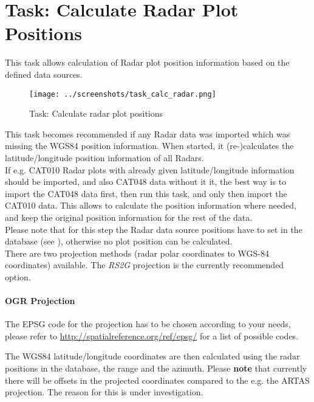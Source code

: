 \section{Task: Calculate Radar Plot Positions}
\label{sec:task_calc_radar_pos}

This task allows calculation of Radar plot position information based on the defined data sources.

\begin{figure}[H]
  \hspace*{-2.5cm}
    \texttt{[image: ../screenshots/task\_calc\_radar.png]}
  \caption{Task: Calculate radar plot positions}
  \label{fig:task_calc_radar}
\end{figure}

This task becomes recommended if any Radar data was imported which was missing the WGS84 position information. When started, it (re-)calculates the latitude/longitude position information of all Radars. \\

If e.g. CAT010 Radar plots with already given latitude/longitude information should be imported, and also CAT048 data without it it, the best way is to import the CAT048 data first, then run this task, and only then import the CAT010 data. This allows to calculate the position information where needed, and keep the original position information for the rest of the data. \\


Please note that for this step the Radar data source positions have to set in the database (see ), otherwise no plot position can be calculated.  \\

There are two projection methods (radar polar coordinates to WGS-84 coordinates) available. The \textit{RS2G} projection is the currently recommended option.

\paragraph{OGR Projection}

The EPSG code for the projection has to be chosen according to your needs, please refer to \url{http://spatialreference.org/ref/epsg/} for a list of possible codes.

The WGS84 latitude/longitude coordinates are then calculated using the radar positions in the database, the range and the azimuth. Please \textbf{note} that currently there will be offsets in the projected coordinates compared to the e.g. the ARTAS projection. The reason for this is under investigation.

